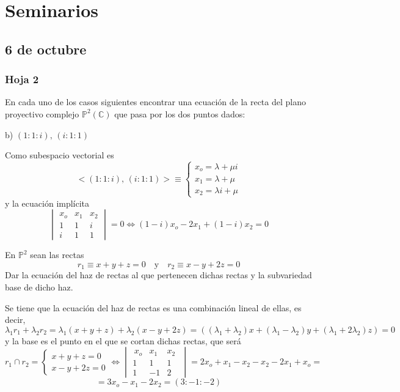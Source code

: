 
\chapter{Seminarios}
\section{6 de octubre}
\subsection{Hoja 2}
\begin{ejer}
[17] En cada uno de los casos siguientes encontrar una ecuaci\'on de la recta del plano proyectivo complejo $\mathbb P^2 (\mathbb C)$ que pasa por los dos puntos dados:
    
    b) $(1:1:i),\, (i:1:1)$
\end{ejer}
\begin{sol}
    Como subespacio vectorial es 
    $$<(1:1:i),\, (i:1:1)> \equiv \begin{cases}
        x_o=\lambda+\mu i \\ x_1 = \lambda + \mu \\ x_2=\lambda i+\mu
    \end{cases}$$ y la ecuaci\'on impl\'icita
    $$\begin{vmatrix}
        x_o & x_1 & x_2 \\ 1 & 1 & i \\ i & 1 & 1
    \end{vmatrix} = 0 \iff (1-i) x_o -2x_1 + (1-i) x_2 = 0$$
\end{sol}
\begin{ejer}
    [23] En $\mathbb P^2$ sean las rectas 
    $$r_1 \equiv x + y + z = 0 \quad  \text{y} \quad r_2 \equiv x - y + 2z = 0$$ 
    Dar la ecuaci\'on del haz de rectas al que pertenecen dichas rectas y la subvariedad base de dicho haz.
\end{ejer}
\begin{sol}
    Se tiene que la ecuaci\'on del haz de rectas es una combinaci\'on lineal de ellas, es decir, 
    $$\lambda_1 r_1 +\lambda_2 r_2 = \lambda_1(x + y + z)+\lambda_2(x - y +2 z)=((\lambda_1+\lambda_2)x+(\lambda_1-\lambda_2)y+(\lambda_1+2\lambda_2)z)=0$$
    y la base es el punto en el que se cortan dichas rectas, que ser\'a 
    $$r_1\cap r_2 = \begin{cases}
        x + y + z = 0 \\ x - y + 2z = 0
    \end{cases} \iff \begin{vmatrix}
        \, x_o & x_1 & x_2 \,\, \\ 1 & 1 & 1 \\ 1 & -1 & 2
    \end{vmatrix} = 2x_o+x_1-x_2-x_2-2x_1+x_o=$$
    $$=3x_o-x_1-2x_2=(3:-1:-2)$$
\end{sol}
